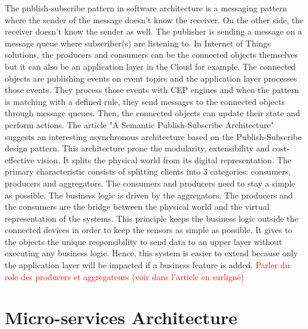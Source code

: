 \documentclass[11pt]{article}
\begin{document}
The publish-subscribe pattern in software architecture is a messaging pattern where the sender of the message doesn't know the receiver. On the other side, the receiver doesn't know the sender as well. The publisher is sending a message on a message queue where subscriber(s) are listening to. In Internet of Things solutions, the producers and consumers can be the connected objects themselves but it can also be an application layer in the Cloud for example. The connected objects are publishing events on event topics and the application layer processes those events. They process those events with CEP engines and when the pattern is matching with a defined rule, they send messages to the connected objects through message queues. Then, the connected objects can update their state and perform actions.
\newline
\newline
The article "A Semantic Publish-Subscribe Architecture" \cite{A Semantic Publish-Subscribe Architecture} suggests an interesting asynchronous architecture based on the Publish-Subscribe design pattern. This architecture prone the modularity, extensibility and cost-effective vision. It splits the physical world from its digital representation. The primary characteristic consists of splitting clients into 3 categories: consumers, producers and aggregators. The consumers and producers need to stay a simple as possible. The business logic is driven by the aggregators. The producers and the consumers are the bridge between the physical world and the virtual representation of the systems. This principle keeps the business logic outside the connected devices in order to keep the sensors as simple as possible. It gives to the objects the unique responsibility to send data to an upper layer without executing any business logic. Hence, this system is easier to extend because only the application layer will be impacted if a business feature is added.
\newline
\newline
\textcolor{red}{Parler du role des producers et aggregateurs (voir dans l'article en surligné)}

\section{Micro-services Architecture}



\end{document}
